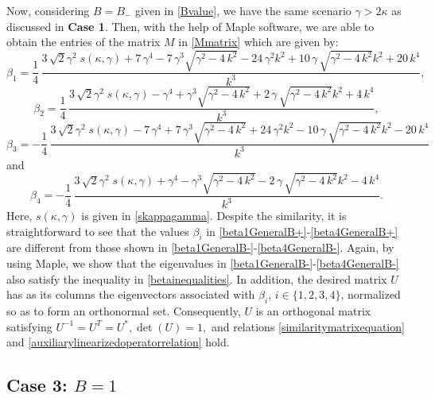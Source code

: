 \documentclass[10pt,reqno,a4paper]{amsart} %
\theoremstyle{definition} %
\numberwithin{equation}{section}
\numberwithin{figure}{section}
\begin{document}
Now, considering $B = B_-$ given in \eqref{Bvalue}, we have the same scenario $\gamma > 2\kappa$ as discussed in \textbf{Case 1}. Then, with the help of Maple software, we are able to obtain the entries of the matrix $M$ in \eqref{Mmatrix} which are given by:
\begin{equation}\label{beta1GeneralB-}
\beta_1=\frac{1}{4}\,{\frac {3\,\sqrt {2}{\gamma}^{2}\; s(\kappa,\gamma)+7\,{\gamma}^{4}-7\,
{\gamma}^{3}\sqrt {{\gamma}^{2}-4\,{k}^{2}}-24\,{\gamma}^{2}{k}^{2}+10
\,\gamma\,\sqrt {{\gamma}^{2}-4\,{k}^{2}}{k}^{2}+20\,{k}^{4}}{{k}^{3}}
},
\end{equation}
\begin{equation}\label{beta2GeneralB-}
\beta_2=\frac{1}{4}\,{\frac {3\,\sqrt {2}{\gamma}^{2}\; s(\kappa,\gamma)-{\gamma}^{4}+{
\gamma}^{3}\sqrt {{\gamma}^{2}-4\,{k}^{2}}+2\,\gamma\,\sqrt {{\gamma}^
{2}-4\,{k}^{2}}{k}^{2}+4\,{k}^{4}}{{k}^{3}}},
\end{equation}
\begin{equation}\label{beta3GeneralB-}
\beta_3=-\frac{1}{4}\,{\frac {3\,\sqrt {2}{\gamma}^{2}\; s(\kappa,\gamma)-7\,{\gamma}^{4}+7\,
{\gamma}^{3}\sqrt {{\gamma}^{2}-4\,{k}^{2}}+24\,{\gamma}^{2}{k}^{2}-10
\,\gamma\,\sqrt {{\gamma}^{2}-4\,{k}^{2}}{k}^{2}-20\,{k}^{4}}{{k}^{3}}
}
\end{equation}
and 
\begin{equation}\label{beta4GeneralB-}
\beta_4=-\frac{1}{4}\,{\frac {3\,\sqrt {2}{\gamma}^{2}\; s(\kappa,\gamma)+{\gamma}^{4}-{
\gamma}^{3}\sqrt {{\gamma}^{2}-4\,{k}^{2}}-2\,\gamma\,\sqrt {{\gamma}^
{2}-4\,{k}^{2}}{k}^{2}-4\,{k}^{4}}{{k}^{3}}}.
\end{equation}
Here, $s(\kappa, \gamma)$ is given in \eqref{skappagamma}. Despite the similarity, it is straightforward to see that the values $\beta_i$ in \eqref{beta1GeneralB+}-\eqref{beta4GeneralB+} are different from those shown in \eqref{beta1GeneralB-}-\eqref{beta4GeneralB-}. Again, by using Maple, we show that the eigenvalues in \eqref{beta1GeneralB-}-\eqref{beta4GeneralB-} also satisfy the inequality in \eqref{betainequalities}. In addition, the desired matrix $U$ has as its columns the eigenvectors associated with $\beta_i$, $i \in \{1,2,3,4\}$, normalized so as to form an orthonormal set. Consequently, $U$ is an orthogonal matrix satisfying
$
U^{-1} = U^{T} = U^{*}, \det(U) = 1,
$
and relations \eqref{similaritymatrixequation} and \eqref{auxiliarylinearizedoperatorrelation} hold.


\subsection*{Case 3: $B=1$}\label{Spectral analysis- Case iii)}
\end{document}
